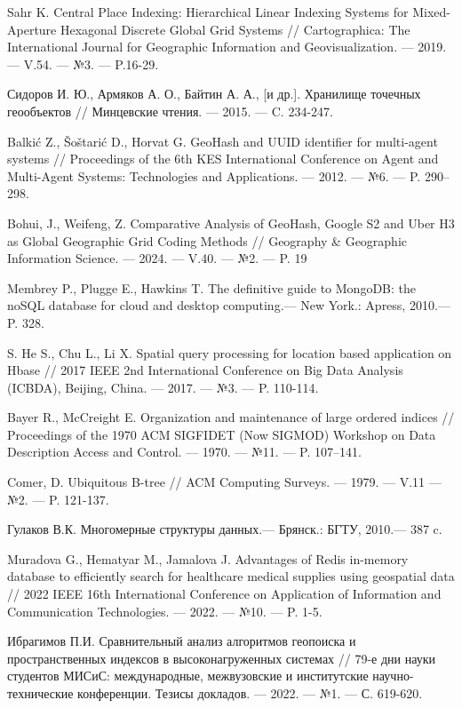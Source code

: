 \begin{thebibliography}{9}
Sahr K. Central Place Indexing: Hierarchical Linear Indexing Systems for Mixed-Aperture Hexagonal Discrete Global Grid Systems // Cartographica: The International Journal for Geographic Information and Geovisualization. --- 2019. --- V.54. --- №3. --- P.16-29.

Сидоров И. Ю., Армяков А. О., Байтин А. А., [и др.]. Хранилище точечных геообъектов // Минцевские чтения. --- 2015. --- C. 234-247.

Balkić Z., Šoštarić D., Horvat G. GeoHash and UUID identifier for multi-agent systems // Proceedings of the 6th KES International Conference on Agent and Multi-Agent Systems: Technologies and Applications. --- 2012. --- №6. --- P. 290–298.

Bohui, J., Weifeng, Z. Comparative Analysis of GeoHash, Google S2 and Uber H3 as Global Geographic Grid Coding Methods // Geography & Geographic Information Science. --- 2024. --- V.40. --- №2. --- P. 19

Membrey P., Plugge E., Hawkins T. The definitive guide to MongoDB: the
noSQL database for cloud and desktop computing.--- New York.: Apress, 2010.--- P. 328.

S. He S., Chu L., Li X. Spatial query processing for location based application on Hbase // 2017 IEEE 2nd International Conference on Big Data Analysis (ICBDA), Beijing, China. --- 2017. --- №3. --- P. 110-114.

Bayer R., McCreight E. Organization and maintenance of large ordered indices // Proceedings of the 1970 ACM SIGFIDET (Now SIGMOD) Workshop on Data Description Access and Control. --- 1970. --- №11. --- P. 107–141.

Comer, D. Ubiquitous B-tree // ACM Computing Surveys. --- 1979. --- V.11 --- №2. --- P. 121-137.

Гулаков В.К. Многомерные структуры данных.--- Брянск.: БГТУ, 2010.--- 387 c.

Muradova G., Hematyar M., Jamalova J. Advantages of Redis in-memory database to efficiently search for healthcare medical supplies using geospatial data // 2022 IEEE 16th International Conference on Application of Information and Communication Technologies. --- 2022. --- №10. --- P. 1-5.

Ибрагимов П.И. Сравнительный анализ алгоритмов геопоиска и пространственных индексов в высоконагруженных системах // 79-е дни науки студентов МИСиС: международные, межвузовские и институтские научно-технические конференции. Тезисы докладов. --- 2022. --- №1. --- С. 619-620. 

\end{thebibliography}

